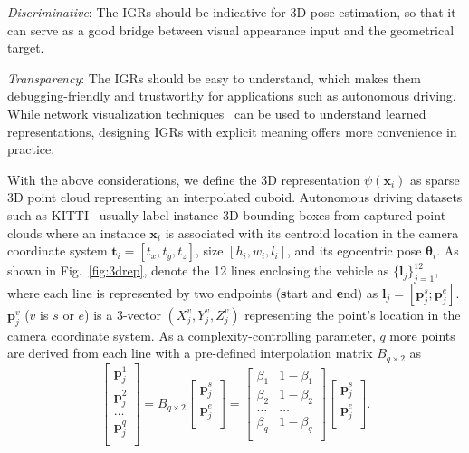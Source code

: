 \documentclass[final]{cvpr}
\begin{document}
\noindent \emph{Discriminative}: The IGRs should be indicative for 3D pose estimation, so that it can serve as a good bridge between visual appearance input and the geometrical target.

\noindent \emph{Transparency}: The IGRs should be easy to understand, which makes them debugging-friendly and trustworthy for applications such as autonomous driving. While network visualization techniques~\cite{simonyan2013deep, li2019visualizing, li2019facial} can be used to understand learned representations, designing IGRs with explicit meaning offers more convenience in practice.


With the above considerations, we define the 3D representation  $\psi(\mathbf{x}_i)$ as sparse 3D point cloud representing an interpolated cuboid. Autonomous driving datasets such as KITTI~\cite{geiger2012we} usually label instance 3D bounding boxes from captured point clouds where an instance $\mathbf{x}_i$ is associated with its centroid location in the camera coordinate system $\mathbf{t}_i = [t_x, t_y, t_z]$, size $[h_i, w_i, l_i]$, and its egocentric pose $\bm{\theta}_i$. As shown in Fig.~\ref{fig:3drep}, denote the 12 lines enclosing the vehicle as $\{\mathbf{l}_j\}_{j=1}^{12}$, where each line is represented by two endpoints (\textbf{s}tart and \textbf{e}nd) as $\mathbf{l}_j = [\mathbf{p}_j^{s}; \mathbf{p}_j^{e}]$. $\mathbf{p}_j^v$  ($v$ is $s$ or $e$) is a 3-vector $(X_j^{v}, Y_j^{v}, Z_j^{v})$ representing the point's location in the camera coordinate system. As a complexity-controlling parameter, $q$ more points are derived from each line with a pre-defined interpolation matrix $B_{q \times 2}$ as
\begin{equation}
\begin{bmatrix}
\mathbf{p}_j^1 \\
\mathbf{p}_j^2 \\
\dots \\
\mathbf{p}_j^q \\
\end{bmatrix}
=
B_{q \times 2}
\begin{bmatrix}
\mathbf{p}_j^{s} \\
\mathbf{p}_j^{e} \\
\end{bmatrix}
=
\begin{bmatrix}
\beta_1 & 1 - \beta_1 \\
\beta_2 & 1 - \beta_2 \\
\dots & \dots \\
\beta_q & 1 - \beta_q \\
\end{bmatrix}
\begin{bmatrix}
\mathbf{p}_j^{s} \\
\mathbf{p}_j^{e} \\
\end{bmatrix}.
\end{equation} 
\end{document}
